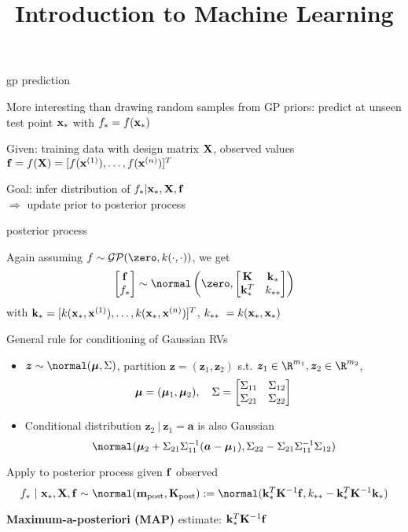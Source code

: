 \documentclass[11pt,compress,t,notes=noshow, xcolor=table]{beamer}
\title{Introduction to Machine Learning}
\begin{document}

\begin{framei}[sep=L]{gp prediction}
\item More interesting than drawing random samples from GP priors: predict at unseen test point $\xs$ with $f_\ast = f(\xs)$
\item Given: training data with design matrix $\Xmat$, observed values $\fv = f(\Xmat) = \fvec^T$
\item Goal: infer distribution of $f_\ast | \xs, \Xmat, \fv$ \\$\Rightarrow$ update prior to posterior process
\end{framei}

\begin{framei}[sep=M]{posterior process}
\item Again assuming $f \sim \GPzk$, we get
$$\begin{bmatrix}
\fv \\ f_\ast
\end{bmatrix} \sim  
\normal \left(\zero, \begin{bmatrix} \Kmat & \ks \\ \ks^T & \kss\end{bmatrix}\right)$$
with $\ks = [k(\xs, \xi[1]), \dots, k(\xs, \xi[n])]^T$,  $ \kss\ = k(\xs, \xs)$
\item General rule for conditioning of Gaussian RVs
\begin{itemize}
\item $\bm{z} \sim \normal(\muv, \Sigma)$, partition $\bm{z} = (\bm{z}_1, \bm{z}_2)$ s.t. $\bm{z}_1 \in \R^{m_1}, \bm{z}_2 \in \R^{m_2}$, $$\muv = (\muv_1, \muv_2), \quad \Sigma = \begin{bmatrix} \Sigma_{11} & \Sigma_{12} \\ \Sigma_{21} & \Sigma_{22} \end{bmatrix} $$
\item Conditional distribution $\bm{z}_2 ~|~ \bm{z}_1 = \bm{a}$ is also Gaussian 
$$\normal(\muv_2 + \Sigma_{21} \Sigma_{11}^{-1} (\bm{a} - \muv_1), \Sigma_{22} - \Sigma_{21}\Sigma_{11}^{-1} \Sigma_{12})$$
\end{itemize}
\item Apply to posterior process given $\fv$ observed $$f_* ~|~ \xs, \Xmat, \fv \sim \normal(\mv_{\text{post}}, \Kmat_\text{post}) := \normal(\ks^{T}\Kinv\fv, \kss - \ks^T \Kmat ^{-1}\ks)$$
\item \textbf{Maximum-a-posteriori (MAP)} estimate: $\ks^{T}\Kinv\fv$
\end{framei}
\end{document}
